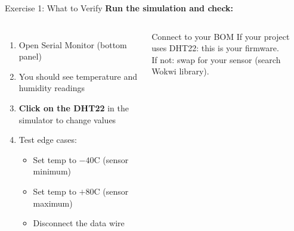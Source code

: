 \documentclass[aspectratio=169,11pt]{beamer}
\begin{document}
\begin{frame}[shrink=5]{Exercise 1: What to Verify}
    \textbf{Run the simulation and check:}

    \vspace{0.2cm}
    \begin{columns}
        \begin{enumerate}
            \item Open Serial Monitor (bottom panel)
            \item You should see temperature and humidity readings
            \item \textbf{Click on the DHT22} in the simulator to change values
            \item Test edge cases:
            \begin{itemize}
                \item Set temp to $-40$\textdegree{}C (sensor minimum)
                \item Set temp to $+80$\textdegree{}C (sensor maximum)
                \item Disconnect the data wire
            \end{itemize}
        \end{enumerate}


        \vspace{0.15cm}
        \begin{block}{Connect to your BOM}
            \small
            If your project uses DHT22: this is your firmware.\\
            If not: swap for your sensor (search Wokwi library).
        \end{block}
    \end{columns}
\end{frame}
\end{document}
